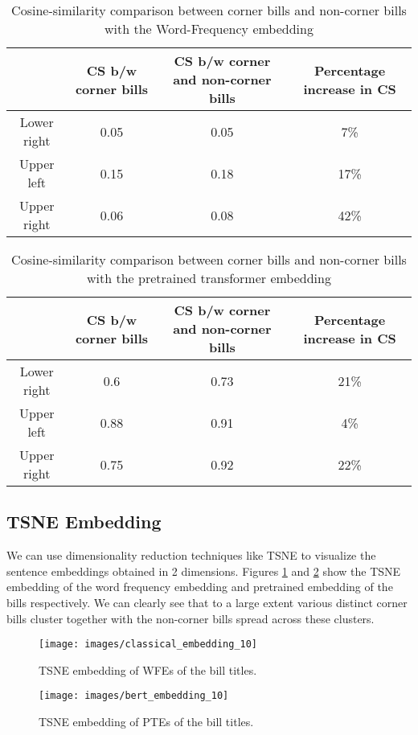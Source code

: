 \documentclass[11pt, letter]{article}
\begin{document}
\begin{table}[h!]
    \centering
\begin{tabular}{||c | c | c | c ||}
 \hline
  & CS b/w corner bills & CS b/w corner and non-corner bills & Percentage increase in CS \\ [0.5ex]
 \hline\hline
Lower right & 0.05 & 0.05 & 7\% \\
 \hline
 Upper left& 0.15 & 0.18  & 17\% \\
 \hline
 Upper right & 0.06 & 0.08 & 42\% \\ [1ex]
 \hline
\end{tabular}
\caption{Cosine-similarity comparison between corner bills and non-corner bills with the Word-Frequency embedding}
\label{tab1}
\end{table}
\begin{table}[h!]
    \centering
\begin{tabular}{||c | c | c | c ||}
 \hline
  & CS b/w corner bills & CS b/w corner and non-corner bills & Percentage increase in CS \\ [0.5ex]
 \hline\hline
Lower right & 0.6 & 0.73 & 21\% \\
 \hline
 Upper left& 0.88 & 0.91  & 4\% \\
 \hline
 Upper right & 0.75 & 0.92 & 22\% \\ [1ex]
 \hline
\end{tabular}
\caption{Cosine-similarity comparison between corner bills and non-corner bills with the pretrained transformer embedding}
\label{tab2}
\end{table}

\subsection{TSNE Embedding}

We can use dimensionality reduction techniques like TSNE to visualize the sentence embeddings
obtained in 2 dimensions. Figures \ref{fig3} and \ref{fig4} show the TSNE embedding of the word frequency embedding
and pretrained embedding of the bills respectively. We can clearly see that to a large extent various
distinct corner bills cluster together with the non-corner bills spread across these clusters.
        \begin{figure}[t]
        \texttt{[image: images/classical\_embedding\_10]}
        \centering
        \caption{TSNE embedding of WFEs of the bill titles.}
        \label{fig3}
        \end{figure}
        \begin{figure}[t]
        \texttt{[image: images/bert\_embedding\_10]}
        \centering
        \caption{TSNE embedding of PTEs of the bill titles.}
        \label{fig4}
        \end{figure}



\end{document}
